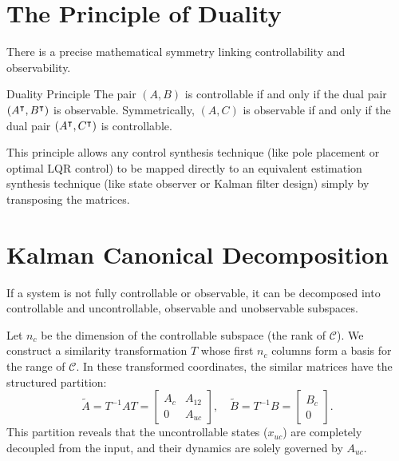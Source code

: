 \section{The Principle of Duality}
There is a precise mathematical symmetry linking controllability and observability.
\begin{mytheorem}{Duality Principle}
The pair $(A, B)$ is controllable if and only if the dual pair $(A^\intercal, B^\intercal)$ is observable. Symmetrically, $(A, C)$ is observable if and only if the dual pair $(A^\intercal, C^\intercal)$ is controllable.
\end{mytheorem}
This principle allows any control synthesis technique (like pole placement or optimal LQR control) to be mapped directly to an equivalent estimation synthesis technique (like state observer or Kalman filter design) simply by transposing the matrices.

\section{Kalman Canonical Decomposition}
If a system is not fully controllable or observable, it can be decomposed into controllable and uncontrollable, observable and unobservable subspaces.

Let $n_c$ be the dimension of the controllable subspace (the rank of $\mathcal{C}$). We construct a similarity transformation $T$ whose first $n_c$ columns form a basis for the range of $\mathcal{C}$. In these transformed coordinates, the similar matrices have the structured partition:
\begin{equation}
\tilde{A} = T^{-1}AT = \begin{bmatrix} A_c & A_{12} \\ 0 & A_{uc} \end{bmatrix}, \quad \tilde{B} = T^{-1}B = \begin{bmatrix} B_c \\ 0 \end{bmatrix} .
\end{equation}
This partition reveals that the uncontrollable states ($x_{uc}$) are completely decoupled from the input, and their dynamics are solely governed by $A_{uc}$.

